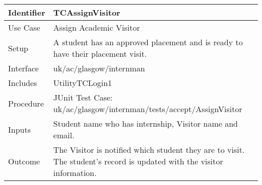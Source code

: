 \begin{tabularx}{\textwidth}{|T|L|}
\hline
Identifier & TCAssignVisitor\\
\hline
Use Case & Assign Academic Visitor\\
\hline
Setup & A student has an approved placement and is ready to have their
placement visit.\\
\hline
Interface & uk/ac/glasgow/internman\\
\hline
Includes & UtilityTCLogin1\\
\hline
Procedure & JUnit Test Case: uk/ac/glasgow/internman/tests/accept/AssignVisitor\\
\hline
Inputs & Student name who has internship, Visitor name and email.\\
\hline
Outcome & The Visitor is notified which student they are to visit. The student's
record is updated with the visitor information.\\
\hline
\end{tabularx}
